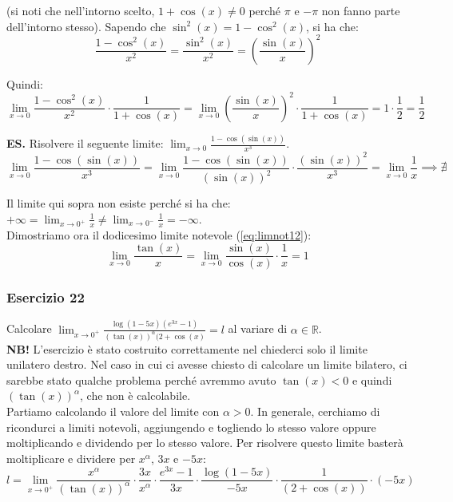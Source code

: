 \documentclass{article}
\begin{document}
\noindent (si noti che nell'intorno scelto, $1 + \cos(x) \neq 0$ perché $\pi$ e $-\pi$ non fanno parte dell'intorno stesso). Sapendo che $\sin^2(x) = 1 - \cos^2(x)$, si ha che:
\begin{equation*}
    \frac{1 - \cos^2(x)}{x^2} = \frac{\sin^2(x)}{x^2} = \left(\frac{\sin(x)}{x}\right)^2
\end{equation*}

\noindent Quindi:
\begin{equation*}
    \lim_{x \to 0} \frac{1 - \cos^2(x)}{x^2} \cdot \frac{1}{1 + \cos(x)} = \lim_{x \to 0} \left(\frac{\sin(x)}{x}\right)^2 \cdot \frac{1}{1 + \cos(x)} = 1 \cdot \frac{1}{2} = \frac{1}{2}
\end{equation*}

\noindent\textbf{ES.} Risolvere il seguente limite: $\lim_{x \to 0} \frac{1 - \cos(\sin(x))}{x^3}$.
\begin{equation*}
    \lim_{x \to 0} \frac{1 - \cos(\sin(x))}{x^3} = \lim_{x \to 0} \frac{1 - \cos(\sin(x))}{(\sin(x))^2} \cdot \frac{(\sin(x))^2}{x^3} = \lim_{x \to 0} \frac{1}{x} \implies \nexists
\end{equation*}

\noindent Il limite qui sopra non esiste perché si ha che: $+\infty 
 = \lim_{x \to 0^+} \frac{1}{x} \neq \lim_{x \to 0^-} \frac{1}{x} = -\infty$.\\

\noindent Dimostriamo ora il dodicesimo limite notevole (\ref{eq:limnot12}):
\begin{equation*}
    \lim_{x \to 0} \frac{\tan(x)}{x} = \lim_{x \to 0} \frac{\sin(x)}{\cos(x)} \cdot \frac{1}{x} = 1
\end{equation*}

\subsubsection{Esercizio 22}
Calcolare $\lim_{x \to 0^+} \frac{\log(1 - 5x)(e^{3x} - 1)}{(\tan(x))^\alpha(2 + \cos(x)} = l$ al variare di $\alpha \in \mathbb{R}$.\\

\noindent\textbf{NB!} L'esercizio è stato costruito correttamente nel chiederci solo il limite unilatero destro. Nel caso in cui ci avesse chiesto di calcolare un limite bilatero, ci sarebbe stato qualche problema perché avremmo avuto $\tan(x) < 0$ e quindi $(\tan(x))^\alpha$, che non è calcolabile.\\

\noindent Partiamo calcolando il valore del limite con $\alpha > 0$. In generale, cerchiamo di ricondurci a limiti notevoli, aggiungendo e togliendo lo stesso valore oppure moltiplicando e dividendo per lo stesso valore. Per risolvere questo limite basterà moltiplicare e dividere per $x^\alpha$, $3x$ e $-5x$:
\begin{equation*}
    l = \lim_{x \to 0^+} \frac{x^\alpha}{(\tan(x))^\alpha} \cdot \frac{3x}{x^\alpha} \cdot \frac{e^{3x} - 1}{3x} \cdot \frac{\log(1 - 5x)}{-5x} \cdot \frac{1}{(2 + \cos(x))} \cdot (-5x)
\end{equation*}
\end{document}
